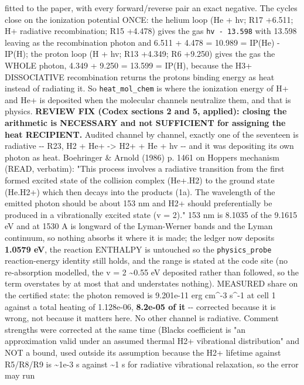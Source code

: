\documentclass[english,a4paper]{my_memo}
\begin{document}
\begin{itemize}
  fitted to the paper, with every forward/reverse pair an exact negative. The
  cycles close on the ionization potential ONCE: the helium loop (He + hv;
  R17 +6.511; H+ radiative recombination; R15 +4.478) gives the gas
  \texttt{hv\ -\ 13.598} with 13.598 leaving as the recombination photon and
  6.511 + 4.478 = 10.989 = IP(He) - IP(H); the proton loop (H + hv; R13 +4.349;
  R6 +9.250) gives the gas the WHOLE photon, 4.349 + 9.250 = 13.599 = IP(H),
  because the H3+ DISSOCIATIVE recombination returns the proton\textquotesingle s binding
  energy as heat instead of radiating it. So \texttt{heat\_mol\_chem} is where the
  ionization energy of H+ and He+ is deposited when the molecular channels
  neutralize them, and that is physics. \textbf{REVIEW FIX (Codex sections 2 and 5,
  applied): closing the arithmetic is NECESSARY and not SUFFICIENT for
  assigning the heat RECIPIENT.} Audited channel by channel, exactly one of
  the seventeen is radiative -\/- R23, H2 + He+ -\textgreater{} H2+ + He + hv -\/- and it was
  depositing its own photon as heat. Boehringer \& Arnold (1986) p. 1461 on
  Hopper\textquotesingle s mechanism (READ, verbatim): "This process involves a radiative
  transition from the first formed excited state of the collision complex
  (He+.H2) to the ground state (He.H2+) which then decays into the products
  (1a). The wavelength of the emitted photon should be about 153 nm and H2+
  should preferentially be produced in a vibrationally excited state (v = 2)."
  153 nm is 8.1035 of the 9.1615 eV and at 1530 A is longward of the
  Lyman-Werner bands and the Lyman continuum, so nothing absorbs it where it is
  made; the ledger now deposits \textbf{1.0579 eV}, the reaction ENTHALPY is
  untouched so the \texttt{physics\_probe} reaction-energy identity still holds, and
  the range is stated at the code site (no re-absorption modelled, the v = 2
  \textasciitilde0.55 eV deposited rather than followed, so the term overstates by at most
  that and understates nothing). MEASURED share on the certified state: the
  photon removed is 9.201e-11 erg cm\^{}-3 s\^{}-1 at cell 1 against a total heating
  of 1.128e-06, \textbf{8.2e-05 of it} -\/- corrected because it is wrong, not because
  it matters here. No other channel is radiative. Comment strengths were
  corrected at the same time (Black\textquotesingle s coefficient is "an approximation valid
  under an assumed thermal H2+ vibrational distribution" and NOT a bound, used
  outside its assumption because the H2+ lifetime against R5/R8/R9 is \textasciitilde1e-3 s
  against \textasciitilde1 s for radiative vibrational relaxation, so the error may run

\end{itemize}
\end{document}
